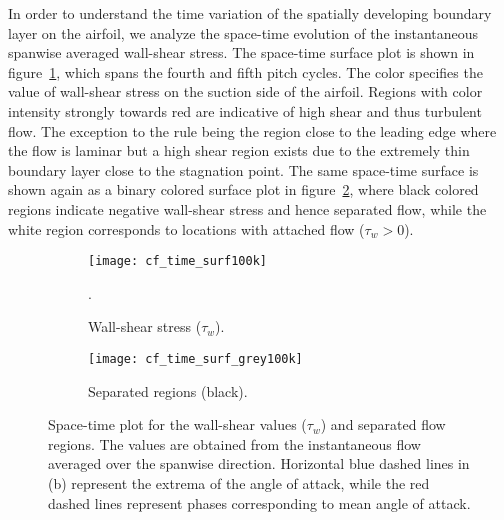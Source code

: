 In order to understand the time variation of the spatially developing boundary layer on the airfoil, we analyze the space-time evolution of the instantaneous spanwise averaged wall-shear stress. The space-time surface plot is shown in figure~\ref{fig:cf-time}, which spans the fourth and fifth pitch cycles. The color specifies the value of wall-shear stress on the suction side of the airfoil. Regions with color intensity strongly towards red are indicative of high shear and thus turbulent flow. The exception to the rule being the region close to the leading edge where the flow is laminar but a high shear region exists due to the extremely thin boundary layer close to the stagnation point. The same space-time surface is shown again as a binary colored surface plot in figure~\ref{fig:separation-time}, where black colored regions indicate negative wall-shear stress and hence separated flow, while the white region corresponds to locations with attached flow ($\tau_{w}>0$).
\begin{figure}[h]
	\centering
	\begin{subfigure}[t]{0.45\textwidth}
		\centering
		\texttt{[image: cf\_time\_surf100k]}
		\caption{Wall-shear stress ($\tau_{w}$).}. 
		\label{fig:cf-time}
	\end{subfigure}
	\begin{subfigure}[t]{0.45\textwidth}
		\centering
		\texttt{[image: cf\_time\_surf\_grey100k]}
		\caption{Separated regions (black).} 
		\label{fig:separation-time}
	\end{subfigure}
	\caption{Space-time plot for the wall-shear values ($\tau_{w}$) and separated flow regions. The values are obtained from the instantaneous flow averaged over the spanwise direction. Horizontal blue dashed lines in (b) represent the extrema of the angle of attack, while the red dashed lines represent phases corresponding to mean angle of attack.}
	\label{fig:space-time}
\end{figure}

